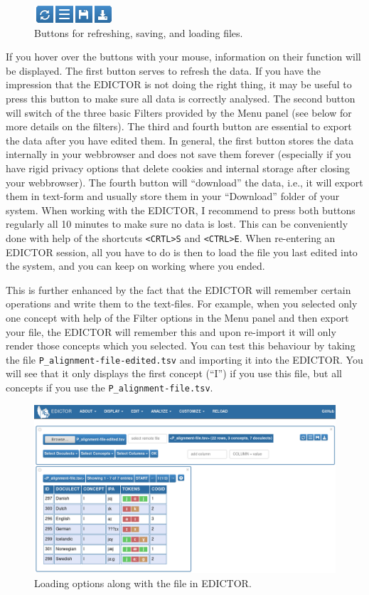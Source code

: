 \documentclass[a4paper,svgnames]{scrartcl}
\begin{document}
\begin{figure}
\centering
\includegraphics{images/figure-4.png}
\caption{Buttons for refreshing, saving, and loading files.}
\end{figure}

If you hover over the buttons with your mouse, information on their
function will be displayed. The first button serves to refresh the data.
If you have the impression that the EDICTOR is not doing the right
thing, it may be useful to press this button to make sure all data is
correctly analysed. The second button will switch of the three basic
Filters provided by the Menu panel (see below for more details on the
filters). The third and fourth button are essential to export the data
after you have edited them. In general, the first button stores the data
internally in your webbrowser and does not save them forever (especially
if you have rigid privacy options that delete cookies and internal
storage after closing your webbrowser). The fourth button will
``download'' the data, i.e., it will export them in text-form and
usually store them in your ``Download'' folder of your system. When
working with the EDICTOR, I recommend to press both buttons regularly
all 10 minutes to make sure no data is lost. This can be conveniently
done with help of the shortcuts \texttt{\textless{}CRTL\textgreater{}S}
and \texttt{\textless{}CTRL\textgreater{}E}. When re-entering an EDICTOR
session, all you have to do is then to load the file you last edited
into the system, and you can keep on working where you ended.

This is further enhanced by the fact that the EDICTOR will remember
certain operations and write them to the text-files. For example, when
you selected only one concept with help of the Filter options in the
Menu panel and then export your file, the EDICTOR will remember this and
upon re-import it will only render those concepts which you selected.
You can test this behaviour by taking the file
\texttt{P\_alignment-file-edited.tsv} and importing it into the EDICTOR.
You will see that it only displays the first concept (``I'') if you use
this file, but all concepts if you use the
\texttt{P\_alignment-file.tsv}.

\begin{figure}
\centering
\includegraphics{images/figure-5.png}
\caption{Loading options along with the file in EDICTOR.}
\end{figure}
\end{document}

